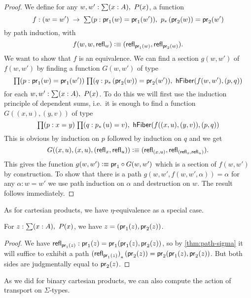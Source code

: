 \begin{proof}
We define for any $w,w':\sm{x:A}P(x)$, a function
\begin{equation*}
f: (w=w') \;\to\; \sm{p:\proj{1}(w)=\proj{1}(w')}\trans{p}{\proj{2}(w)}=\proj{2}(w^\prime)
\end{equation*}
by path induction, with
\begin{equation*}
f(w,w,\mathsf{refl}_{w})\vcentcolon\equiv(\mathsf{refl}_{\mathsf{pr}_{1}(w)},\mathsf{refl}_{\mathsf{pr}_{2}(w)}).
\end{equation*}
We want to show that $f$ is an equivalence.
We can find a section $g(w,w')$ of $f(w,w')$ by finding a function $G(w,w')$ of type
\begin{equation*}
\prd{p:\proj 1(w)=\proj 1(w')}{q:\trans p{\proj 2(w)}=\proj 2(w')}\mathsf{hFiber}(f(w,w'),(p,q))
\end{equation*}
for each $w,w':\sm{x:A}P(x)$. To do this we will first use the induction principle of dependent sums, i.e.\ it is enough to find a function $G((x,u),(y,v))$ of type
\begin{equation*}
\prd{p:x=y}{q:\trans{p}{u}=v}\hfiber{f((x,u),(y,v))}{(p,q)}
\end{equation*}
This is obvious by induction on $p$ followed by induction on $q$ and we get
\begin{equation*}
G((x,u),(x,u),(\mathsf{refl}_{x},\mathsf{refl}_{u}))\vcentcolon\equiv(\mathsf{refl}_{(x,u)},\mathsf{refl}_{(\mathsf{refl}_{x},\mathsf{refl}_{u})}).
\end{equation*}
This gives the function $g(w,w')\vcentcolon\equiv\mathsf{pr}_{1}\circ G(w,w')$ which is a section of $f(w,w')$ by construction. To show that there is a path $g(w,w',f(w,w',\alpha))=\alpha$ for any $\alpha:w=w'$ we use path induction on $\alpha$ and destruction on $w$. The result follows immediately.
\end{proof}

As for cartesian products, we have $\eta$-equivalence as a special case.

\begin{cor}\label{thm:eta-sigma}
  For $z:\sm{x:A} P(x)$, we have $z = (\mathsf{pr}_{1}(z),\mathsf{pr}_{2}(z))$.
\end{cor}
\begin{proof}
  We have $\mathsf{refl}_{\mathsf{pr}_{1}(z)} : \mathsf{pr}_{1}(z) = \mathsf{pr}_{1}(\mathsf{pr}_{1}(z),\mathsf{pr}_{2}(z))$, so by \autoref{thm:path-sigma} it will suffice to exhibit a path ${(\mathsf{refl}_{\mathsf{pr}_{1}(z)})}_{*}\left({\mathsf{pr}_{2}(z)}\right) = \mathsf{pr}_{2}(\mathsf{pr}_{1}(z),\mathsf{pr}_{2}(z))$.
  But both sides are judgmentally equal to $\mathsf{pr}_{2}(z)$.
\end{proof}

As we did for binary cartesian products, we can also compute the action of transport on $\Sigma$-types.

